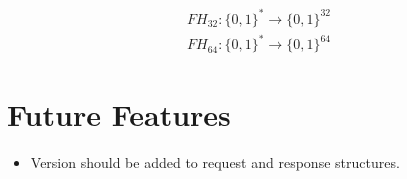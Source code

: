 \documentclass[10pt,a4paper]{article}
\begin{document}
\begin{equation}
\begin{split}
  FH_{32}: \{0, 1\}^* \to \{0, 1\}^{32}  \\
  FH_{64}: \{0, 1\}^* \to \{0, 1\}^{64}
\end{split}
\end{equation}


\section{Future Features}
\begin{itemize}
  \item Version should be added to request and response structures.
\end{itemize}
\end{document}
